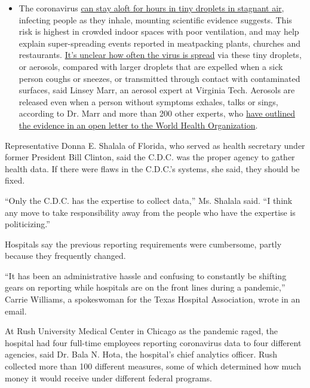 \begin{itemize}
  \begin{itemize}
  \tightlist
  \item
    The coronavirus
    \href{https://www.nytimes3xbfgragh.onion/2020/07/04/health/239-experts-with-one-big-claim-the-coronavirus-is-airborne.html?action=click\&pgtype=Article\&state=default\&region=MAIN_CONTENT_3\&context=storylines_faq}{can
    stay aloft for hours in tiny droplets in stagnant air}, infecting
    people as they inhale, mounting scientific evidence suggests. This
    risk is highest in crowded indoor spaces with poor ventilation, and
    may help explain super-spreading events reported in meatpacking
    plants, churches and restaurants.
    \href{https://www.nytimes3xbfgragh.onion/2020/07/06/health/coronavirus-airborne-aerosols.html?action=click\&pgtype=Article\&state=default\&region=MAIN_CONTENT_3\&context=storylines_faq}{It's
    unclear how often the virus is spread} via these tiny droplets, or
    aerosols, compared with larger droplets that are expelled when a
    sick person coughs or sneezes, or transmitted through contact with
    contaminated surfaces, said Linsey Marr, an aerosol expert at
    Virginia Tech. Aerosols are released even when a person without
    symptoms exhales, talks or sings, according to Dr. Marr and more
    than 200 other experts, who
    \href{https://academic.oup.com/cid/article/doi/10.1093/cid/ciaa939/5867798}{have
    outlined the evidence in an open letter to the World Health
    Organization}.
  \end{itemize}
\end{itemize}

Representative Donna E. Shalala of Florida, who served as health
secretary under former President Bill Clinton, said the C.D.C. was the
proper agency to gather health data. If there were flaws in the C.D.C.'s
systems, she said, they should be fixed.

``Only the C.D.C. has the expertise to collect data,'' Ms. Shalala said.
``I think any move to take responsibility away from the people who have
the expertise is politicizing.''

Hospitals say the previous reporting requirements were cumbersome,
partly because they frequently changed.

``It has been an administrative hassle and confusing to constantly be
shifting gears on reporting while hospitals are on the front lines
during a pandemic,'' Carrie Williams, a spokeswoman for the Texas
Hospital Association, wrote in an email.

At Rush University Medical Center in Chicago as the pandemic raged, the
hospital had four full-time employees reporting coronavirus data to four
different agencies, said Dr. Bala N. Hota, the hospital's chief
analytics officer. Rush collected more than 100 different measures, some
of which determined how much money it would receive under different
federal programs.

